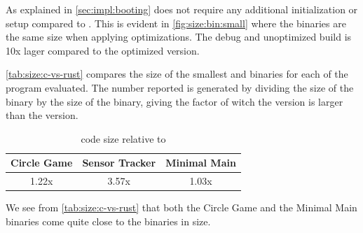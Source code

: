 As explained in \autoref{sec:impl:booting} {\rust} does not require any additional initialization or setup compared to {\C}.
This is evident in \autoref{fig:size:bin:small} where the binaries are the same size when applying optimizations.
The debug and unoptimized {\rust} build is 10x lager compared to the optimized version.

\autoref{tab:size:c-vs-rust} compares the size of the smallest {\C} and {\rust} binaries for each of the program evaluated.
The number reported is generated by dividing the size of the {\rust} binary by the size of the {\C} binary, giving the factor of witch the {\rust} version is larger than the {\C} version.

\begin{table}[H]
  \centering
  \begin{tabular}{|c|c|c|}
    \hline
    Circle Game & Sensor Tracker & Minimal Main \\
    \hline
    1.22x & 3.57x & 1.03x \\
    \hline
  \end{tabular}
  \caption{{\rust} code size relative to {\C}}
  \label{tab:size:c-vs-rust}
\end{table}

We see from \autoref{tab:size:c-vs-rust} that both the Circle Game and the Minimal Main  {\rust} binaries come quite close to the {\C} binaries in size.





